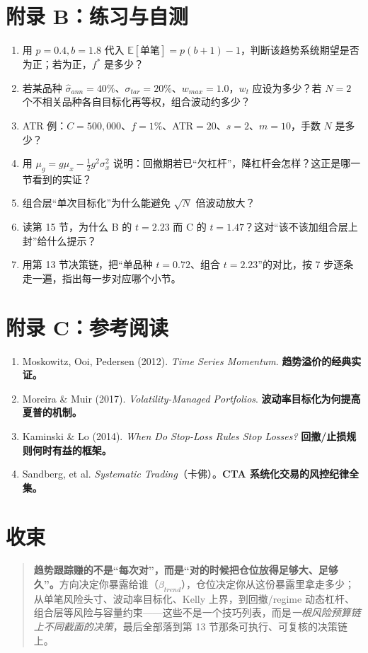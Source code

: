 \documentclass[UTF8,11pt]{ctexart}
\begin{document}
\section*{附录 B：练习与自测}
\begin{enumerate}[itemsep=2pt]
\item 用 $p=0.4,b=1.8$ 代入 $\mathbb{E}[\text{单笔}]=p(b+1)-1$，判断该趋势系统期望是否为正；若为正，$f^{*}$ 是多少？
\item 若某品种 $\hat\sigma_{ann}=40\%$、$\sigma_{tar}=20\%$、$w_{max}=1.0$，$w_t$ 应设为多少？若 $N{=}2$ 个不相关品种各自目标化再等权，组合波动约多少？
\item ATR 例：$C=500{,}000$、$f=1\%$、ATR$=20$、$s=2$、$m=10$，手数 $N$ 是多少？
\item 用 $\mu_g=g\mu_x-\tfrac12g^2\sigma_x^2$ 说明：回撤期若已“欠杠杆”，降杠杆会怎样？这正是哪一节看到的实证？
\item 组合层“单次目标化”为什么能避免 $\sqrt N$ 倍波动放大？
\item 读第 15 节，为什么 B 的 $t=2.23$ 而 C 的 $t=1.47$？这对“该不该加组合层上封”给什么提示？
\item 用第 13 节决策链，把“单品种 $t=0.72$、组合 $t=2.23$”的对比，按 7 步逐条走一遍，指出每一步对应哪个小节。
\end{enumerate}

\section*{附录 C：参考阅读}
\begin{enumerate}[itemsep=2pt]
\item Moskowitz, Ooi, Pedersen (2012). \emph{Time Series Momentum}. \textbf{趋势溢价的经典实证。}
\item Moreira \& Muir (2017). \emph{Volatility-Managed Portfolios}. \textbf{波动率目标化为何提高夏普的机制。}
\item Kaminski \& Lo (2014). \emph{When Do Stop-Loss Rules Stop Losses?} \textbf{回撤/止损规则何时有益的框架。}
\item Sandberg, et al. \emph{Systematic Trading}（卡佛）。\textbf{CTA 系统化交易的风控纪律全集。}
\end{enumerate}

\section*{收束}
\begin{quote}
\textbf{趋势跟踪赚的不是“每次对”，而是“对的时候把仓位放得足够大、足够久”。}方向决定你暴露给谁（$\beta_{trend}$），仓位决定你从这份暴露里拿走多少；从单笔风险头寸、波动率目标化、Kelly 上界，到回撤/regime 动态杠杆、组合层等风险与容量约束——这些不是一个技巧列表，而是\emph{一根风险预算链上不同截面的决策}，最后全部落到第 13 节那条可执行、可复核的决策链上。
\end{quote}
\end{document}
